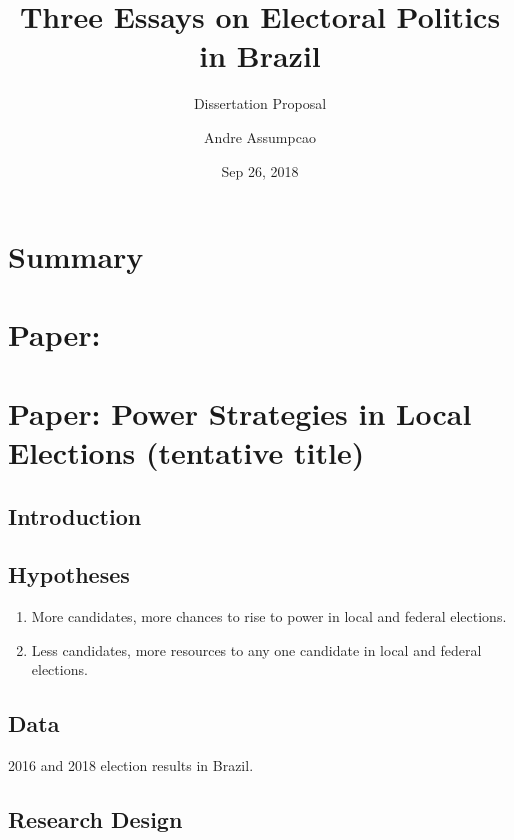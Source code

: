 \documentclass[]{article}
\title{Three Essays on Electoral Politics in Brazil}
\subtitle{Dissertation Proposal}
\author{Andre Assumpcao}
\date{Sep 26, 2018}
\begin{document}
\maketitle

\hypertarget{title}{%
\section*{Summary}\label{title}}

\newpage

\hypertarget{paper}{%
\section{Paper:}\label{paper}}

\newpage

\hypertarget{paper1}{%
\section{Paper: Power Strategies in Local Elections (tentative
title)}\label{paper1}}

\hypertarget{introduction}{%
\subsection{Introduction}\label{introduction}}

\hypertarget{hypotheses}{%
\subsection{Hypotheses}\label{hypotheses}}

\begin{enumerate}
\item
  More candidates, more chances to rise to power in local and federal
  elections.
\item
  Less candidates, more resources to any one candidate in local and
  federal elections.
\end{enumerate}

\hypertarget{data}{%
\subsection{Data}\label{data}}

2016 and 2018 election results in Brazil.

\hypertarget{research-design}{%
\subsection{Research Design}\label{research-design}}
\end{document}
